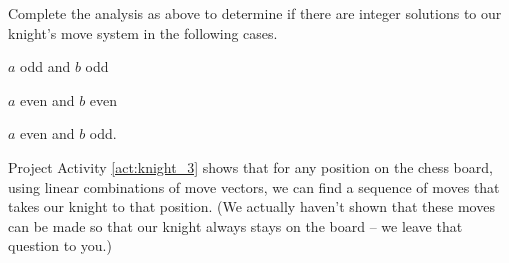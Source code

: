 \begin{pactivity} \label{act:knight_3} Complete the analysis as above to determine if there are integer solutions to our knight's move system in the following cases.
	\ba
	\item $a$ odd and $b$ odd
	\item $a$ even and $b$ even
	\item $a$ even and $b$ odd.
	\ea

\begin{comment}

\ba
\item Assume that $a$ is odd and $b$ is odd. That is, $a = 2r+1$ and $b = 2s+1$ for some integers $r$ and $s$. Then
\begin{align*}
x_1 &= \frac{1}{4}\left( -5x_3 + 3x_4 + 2s + 1 + 4r\right) \\
x_2 &= \frac{1}{4}\left( 3x_3 - 5x_4 + 2s + 1 - 4r \right).
\end{align*}
With a little trial and error we can see that if we let $x_3 = 2s+1$ and $x_4 = 0$, then $x_1 = -2s+r-1$ and $x_2 = 2s-r+1$ is a solution with integer weights. 

\item Assume that $a$ is even and $b$ is even. That is, $a = 2r$ and $b = 2s$ for some integers $r$ and $s$. Then
\begin{align*}
x_1 &= \frac{1}{4}\left( -5x_3 + 3x_4 + 2s  + 4r - 2\right) \\
x_2 &= \frac{1}{4}\left( 3x_3 - 5x_4 + 2s + 1 - 4r + 2 \right).
\end{align*}
With a little trial and error we can see that if we let $x_3 = 2s+1$ and $x_4 = 1$, then $x_1 = -2s+r-1$ and $x_2 = 2s-r$ is a solution with integer weights. 

\item Assume that $a$ is even and $b$ is odd. That is, $a = 2r$ and $b = 2s+1$ for some integers $r$ and $s$. Then
\begin{align*}
x_1 &= \frac{1}{4}\left( -5x_3 + 3x_4 + 2s - 1 + 4r\right) \\
x_2 &= \frac{1}{4}\left( 3x_3 - 5x_4 + 2s + 3 - 4r \right).
\end{align*}
With a little trial and error we can see that if we let $x_3 = 2s$ and $x_4 = -1$, then $x_1 = -2s+r-1$ and $x_2 = 2s-r+2$ is a solution with integer weights. 
\ea

\end{comment}

\end{pactivity}

Project Activity \ref{act:knight_3} shows that for any position on the chess board, using linear combinations of move vectors, we can find a sequence of moves that takes our knight to that position. (We actually haven't shown that these moves can be made so that our knight always stays on the board -- we leave that question to you.)

